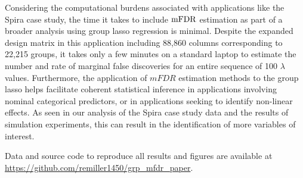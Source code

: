 Considering the computational burdens associated with applications like the Spira case study, the time it takes to include $\textrm{mFDR}$ estimation as part of a broader analysis using group lasso regression is minimal. Despite the expanded design matrix in this application including 88,860 columns corresponding to 22,215 groups, it takes only a few minutes on a standard laptop to estimate the number and rate of marginal false discoveries for an entire sequence of 100 $\lambda$ values.
Furthermore, the application of $mFDR$ estimation methods to the group lasso helps facilitate coherent statistical inference in applications involving nominal categorical predictors, or in applications seeking to identify non-linear effects. As seen in our analysis of the Spira case study data and the results of simulation experiments, this can result in the identification of more variables of interest.


\bigskip


\noindent Data and source code to reproduce all results and figures are available at \url{https://github.com/remiller1450/grp_mfdr_paper}.


